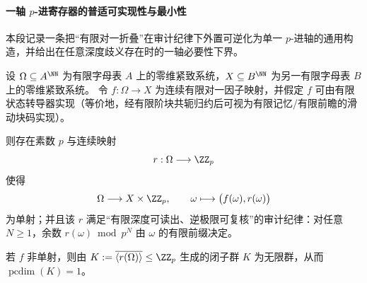 \paragraph{一轴 \texorpdfstring{$p$}{p}-进寄存器的普适可实现性与最小性}
本段记录一条把“有限对一折叠”在审计纪律下外置可逆化为单一 \(p\)-进轴的通用构造，并给出在任意深度歧义存在时的一轴必要性下界。

\begin{theorem}\label{thm:conclusion-uniaxial-zp-replay-reversibilization}
设 \(\Omega\subseteq A^{\NN}\) 为有限字母表 \(A\) 上的零维紧致系统，\(X\subseteq B^{\NN}\) 为另一有限字母表 \(B\) 上的零维紧致系统。
令 \(f:\Omega\to X\) 为连续有限对一因子映射，并假定 \(f\) 可由有限状态转导器实现（等价地，经有限阶块共轭归约后可视为有限记忆/有限前瞻的滑动块码实现）。
\par
则存在素数 \(p\) 与连续映射
\[
r:\Omega\longrightarrow \ZZ_p
\]
使得
\[
\Omega\longrightarrow X\times \ZZ_p,\qquad \omega\longmapsto \bigl(f(\omega),r(\omega)\bigr)
\]
为单射；并且该 \(r\) 满足“有限深度可读出、逆极限可复核”的审计纪律：对任意 \(N\ge 1\)，余数 \(r(\omega)\bmod p^N\) 由 \(\omega\) 的有限前缀决定。
\par
若 \(f\) 非单射，则由
\(
K:=\overline{\langle r(\Omega)\rangle}\le \ZZ_p
\)
生成的闭子群 \(K\) 为无限群，从而 \(\operatorname{pcdim}(K)=1\)。
\end{theorem}

